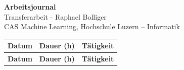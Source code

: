 \documentclass[11pt,a4paper]{scrartcl}
\begin{document}
\begin{center}
  {\LARGE\bfseries Arbeitsjournal}\\[4pt]
  {\large Transferarbeit - Raphael Bolliger}\\[2pt]
  CAS Machine Learning, Hochschule Luzern -- Informatik
\end{center}

\vspace{0.5em}

\begin{longtable}{@{}l r >{\raggedright\arraybackslash}p{\dimexpr\textwidth-6.4cm\relax}@{}}
\toprule
\textbf{Datum} & \textbf{Dauer (h)} & \textbf{Tätigkeit} \\
\midrule
\endfirsthead
\toprule
\textbf{Datum} & \textbf{Dauer (h)} & \textbf{Tätigkeit} \\
\midrule
\endhead


\end{longtable}
\end{document}
